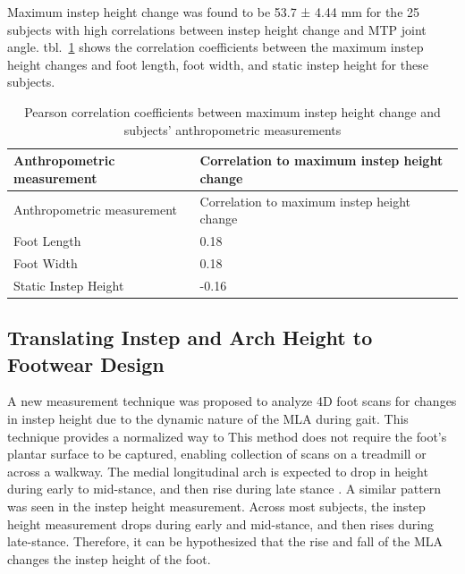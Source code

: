 \documentclass[defaultstyle,11pt]{thesis}
\begin{document}
Maximum instep height change was found to be 53.7 ± 4.44 mm for the 25 subjects with high correlations between instep height change and MTP joint angle.
tbl.~\ref{tbl:corrs} shows the correlation coefficients between the maximum instep height changes and foot length, foot width, and static instep height for these subjects.

\hypertarget{tbl:corrs}{}
\begin{longtable}[]{@{}ll@{}}
\caption{\label{tbl:corrs}Pearson correlation coefficients between maximum instep height change and subjects' anthropometric measurements}\tabularnewline
\toprule
Anthropometric measurement & Correlation to maximum instep height change \\
\midrule
\endfirsthead
\toprule
Anthropometric measurement & Correlation to maximum instep height change \\
\midrule
\endhead
Foot Length & 0.18 \\
Foot Width & 0.18 \\
Static Instep Height & -0.16 \\
\bottomrule
\end{longtable}

\hypertarget{translating-instep-and-arch-height-to-footwear-design}{%
\subsection{Translating Instep and Arch Height to Footwear Design}\label{translating-instep-and-arch-height-to-footwear-design}}

A new measurement technique was proposed to analyze 4D foot scans for changes in instep height due to the dynamic nature of the MLA during gait.
This technique provides a normalized way to This method does not require the foot's plantar surface to be captured, enabling collection of scans on a treadmill or across a walkway.
The medial longitudinal arch is expected to drop in height during early to mid-stance, and then rise during late stance \citep{Hicks1954, Ker1987, Caravaggi2010, Cashmere1999, Leardini2007, Stolwijk2014, Welte2018, Welte2021}.
A similar pattern was seen in the instep height measurement.
Across most subjects, the instep height measurement drops during early and mid-stance, and then rises during late-stance. Therefore, it can be hypothesized that the rise and fall of the MLA changes the instep height of the foot.
\end{document}

